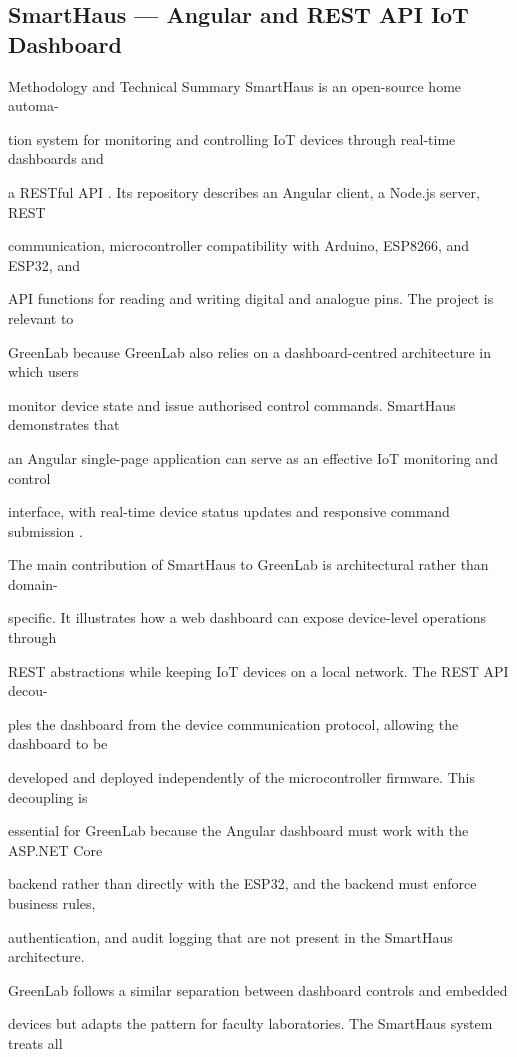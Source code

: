 \subsection{SmartHaus --- Angular and REST API IoT Dashboard}
Methodology and Technical Summary SmartHaus is an open-source home automa-

tion system for monitoring and controlling IoT devices through real-time dashboards and

a RESTful API \cite{smarthaus}. Its repository describes an Angular client, a Node.js server, REST

communication, microcontroller compatibility with Arduino, ESP8266, and ESP32, and

API functions for reading and writing digital and analogue pins. The project is relevant to

GreenLab because GreenLab also relies on a dashboard-centred architecture in which users

monitor device state and issue authorised control commands. SmartHaus demonstrates that

an Angular single-page application can serve as an effective IoT monitoring and control

interface, with real-time device status updates and responsive command submission \cite{smarthaus}.

The main contribution of SmartHaus to GreenLab is architectural rather than domain-

speciﬁc. It illustrates how a web dashboard can expose device-level operations through

REST abstractions while keeping IoT devices on a local network. The REST API decou-

ples the dashboard from the device communication protocol, allowing the dashboard to be

developed and deployed independently of the microcontroller ﬁrmware. This decoupling is

essential for GreenLab because the Angular dashboard must work with the ASP.NET Core

backend rather than directly with the ESP32, and the backend must enforce business rules,

authentication, and audit logging that are not present in the SmartHaus architecture.

GreenLab follows a similar separation between dashboard controls and embedded

devices but adapts the pattern for faculty laboratories. The SmartHaus system treats all

